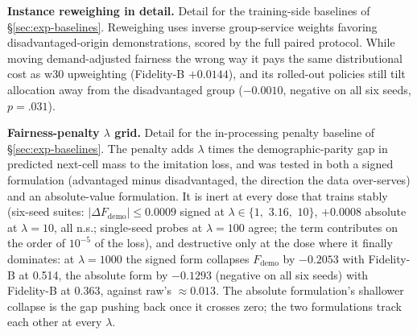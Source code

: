 \textbf{Instance reweighing in detail.} Detail for the training-side
baselines of \S\ref{sec:exp-baselines}. Reweighing uses inverse group-service
weights favoring disadvantaged-origin demonstrations, scored by the full
paired protocol. While moving demand-adjusted fairness the wrong way it pays
the same distributional cost as w30 upweighting (Fidelity-B $+0.0144$), and %
its rolled-out policies still tilt allocation away from the disadvantaged
group ($-0.0010$, negative on all six seeds, $p = .031$).

\textbf{Fairness-penalty $\lambda$ grid.} Detail for the in-processing
penalty baseline of \S\ref{sec:exp-baselines}. The penalty adds $\lambda$
times the demo\-graph\-ic-parity gap in predicted next-cell mass to the
imitation loss, and was tested in
both a signed formulation (advantaged minus disadvantaged, the direction the
data over-serves) and an absolute-value formulation. It is inert at every
dose that trains stably (six-seed suites:
$|\Delta F_{\mathrm{demo}}| \le 0.0009$ signed at
$\lambda \in \{1,$ $3.16,$ $10\}$, $+0.0008$ absolute at $\lambda = 10$, all
n.s.; single-seed probes at $\lambda = 100$ agree; the term contributes on
the order of $10^{-5}$ of the loss), and destructive only at the dose where
it finally dominates: at $\lambda = 1000$ the signed form collapses
$F_{\mathrm{demo}}$ by $-0.2053$ with Fidelity-B at 0.514, the absolute form
by $-0.1293$ (negative on all six seeds) with Fidelity-B at 0.363, against raw's
$\approx 0.013$. The absolute formulation's shallower collapse is the gap
pushing back once it crosses zero; the two formulations track each other at
every $\lambda$.

